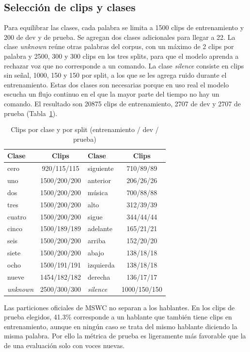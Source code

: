 \documentclass[conference]{IEEEtran}
\begin{document}
\subsection{Selección de clips y clases}
Para equilibrar las clases, cada palabra se limita a 1500 clips de entrenamiento y 200 de dev y de prueba. Se agregan dos clases adicionales para llegar a 22. La clase \textit{unknown} reúne otras palabras del corpus, con un máximo de 2 clips por palabra y 2500, 300 y 300 clips en los tres splits, para que el modelo aprenda a rechazar voz que no corresponde a un comando. La clase \textit{silence} consiste en clips sin señal, 1000, 150 y 150 por split, a los que se les agrega ruido durante el entrenamiento. Estas dos clases son necesarias porque en uso real el modelo escucha un flujo continuo en el que la mayor parte del tiempo no hay un comando. El resultado son 20875 clips de entrenamiento, 2707 de dev y 2707 de prueba (Tabla~\ref{tab:clases}).

\begin{table}[htbp]
\caption{Clips por clase y por split (entrenamiento / dev / prueba)}
\label{tab:clases}
\centering
\small
\setlength{\tabcolsep}{3pt}
\begin{tabular}{lc@{\hspace{1em}}lc}
\toprule
Clase & Clips & Clase & Clips \\
\midrule
cero & 920/115/115 & siguiente & 710/89/89 \\
uno & 1500/200/200 & anterior & 206/26/26 \\
dos & 1500/200/200 & música & 700/88/88 \\
tres & 1500/200/200 & alto & 312/39/39 \\
cuatro & 1500/200/200 & sigue & 344/44/44 \\
cinco & 1500/189/189 & adelante & 165/21/21 \\
seis & 1500/200/200 & arriba & 152/20/20 \\
siete & 1500/200/200 & abajo & 138/18/18 \\
ocho & 1500/191/191 & izquierda & 138/18/18 \\
nueve & 1454/182/182 & derecha & 136/17/17 \\
\textit{unknown} & 2500/300/300 & \textit{silence} & 1000/150/150 \\
\bottomrule
\end{tabular}
\end{table}

Las particiones oficiales de MSWC no separan a los hablantes. En los clips de prueba elegidos, 41.3\% corresponde a un hablante que también tiene clips en entrenamiento, aunque en ningún caso se trata del mismo hablante diciendo la misma palabra. Por ello la métrica de prueba es ligeramente más favorable que la de una evaluación solo con voces nuevas.
\end{document}
